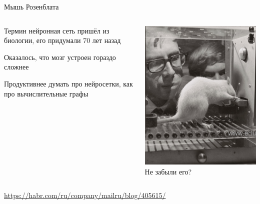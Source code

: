 \documentclass[notes,12pt, aspectratio=169]{beamer}
\newenvironment{wideitemize}{\itemize\addtolength{\itemsep}{10pt}}{\enditemize}
\begin{document}
\begin{frame}{Мышь Розенблата}
\begin{columns}[T]
\begin{column}{.49\textwidth}
	\begin{wideitemize}
		\item Термин нейронная сеть пришёл из биологии, его придумали $70$ лет назад
		\item  Оказалось, что мозг устроен гораздо сложнее
		\item  Продуктивнее думать про нейросетки,  как про вычислительные графы
	\end{wideitemize}
\end{column}
\begin{column}{.49\textwidth}
	\begin{center}
		\includegraphics[scale=0.35]{rozen_mouse.png}  \\
		\Large \alert{Не забыли его?}
	\end{center}
\end{column}
\end{columns}
\vfill %
\footnotesize
\color{blue} \url{https://habr.com/ru/company/mailru/blog/405615/}
\end{frame}
\end{document}
